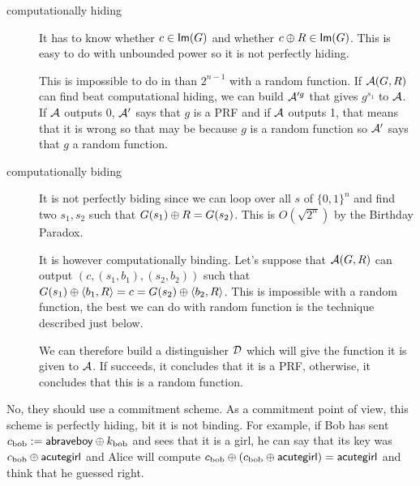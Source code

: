 \newape
\begin{solution}
  \begin{description}
    \item[computationally hiding]
      It has to know whether $c \in \operatorname{\mathsf{Im}}(G)$ and whether $c \oplus R \in \operatorname{\mathsf{Im}}(G)$.
      This is easy to do with unbounded power so it is not perfectly hiding.

      This is impossible to do in than $2^{n-1}$ with a random function.
      If $\mathcal{A}(G,R)$ can find beat computational hiding,
      we can build $\mathcal{A}'^g$ that gives $g^{s_1}$ to $\mathcal{A}$.
      If $\mathcal{A}$ outputs 0, $\mathcal{A}'$ says that $g$ is a PRF and if $\mathcal{A}$ outputs 1,
      that means that it is wrong so that may be because $g$ is a random function
      so $\mathcal{A}'$ says that $g$ a random function.
    \item[computationally biding]
      It is not perfectly biding since we can loop over all $s$ of $\{0,1\}^n$ and find two $s_1,s_2$ such
      that $G(s_1) \oplus R = G(s_2)$.
      This is $O(\sqrt{2^n})$ by the Birthday Paradox.

      It is however computationally binding.
      Let's suppose that $\mathcal{A}(G,R)$ can output $(c, (s_1,b_1), (s_2, b_2))$ such that
      $G(s_1) \oplus \langle b_1,R \rangle = c = G(s_2) \oplus \langle b_2,R \rangle$.
      This is impossible with a random function, the best we can do with random function is the technique described just below.

      We can therefore build a distinguisher $\mathcal{D}$ which will give the function it is given to $\mathcal{A}$.
      If succeeds, it concludes that it is a PRF, otherwise, it concludes that this is a random function.
  \end{description}
\end{solution}

\nosolution
\nosolution

\begin{solution}
  No, they should use a commitment scheme.
  As a commitment point of view, this scheme is perfectly hiding, bit it is not binding.
  For example, if Bob has sent $c_{\text{bob}} := \mathsf{abraveboy} \oplus k_{\text{bob}}$ and sees that it is a girl,
  he can say that its key was $c_{\text{bob}} \oplus \mathsf{acutegirl}$ and Alice will
  compute $c_{\text{bob}} \oplus (c_{\text{bob}} \oplus \mathsf{acutegirl}) = \mathsf{acutegirl}$ and think that he guessed right.
\end{solution}

